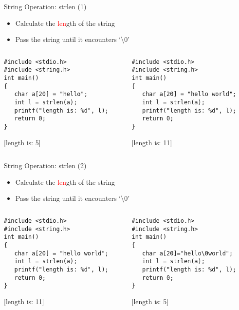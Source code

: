 \begin{frame}[fragile]{String Operation: strlen (1)}
\begin{itemize}
	\item {Calculate the \textcolor{red}{len}gth of the string}
	\item {Pass the string until it encounters `$\setminus$0'}
\end{itemize}
\begin{columns}
\begin{column}{0.5\linewidth}
\begin{lstlisting}
#include <stdio.h>
#include <string.h>
int main()
{
   char a[20] = "hello";
   int l = strlen(a);
   printf("length is: %d", l);
   return 0;
}
\end{lstlisting}
[length is: 5]
\end{column}
\begin{column}{0.5\linewidth}
\begin{lstlisting}
#include <stdio.h>
#include <string.h>
int main()
{
   char a[20] = "hello world";
   int l = strlen(a);
   printf("length is: %d", l);
   return 0;
}
\end{lstlisting}
[length is: 11]
\end{column}
\end{columns}
\end{frame}

\begin{frame}[fragile]{String Operation: strlen (2)}
\begin{itemize}
	\item {Calculate the \textcolor{red}{len}gth of the string}
	\item {Pass the string until it encounters `$\setminus$0'}
\end{itemize}
\begin{columns}
\begin{column}{0.5\linewidth}
\begin{lstlisting}
#include <stdio.h>
#include <string.h>
int main()
{
   char a[20] = "hello world";
   int l = strlen(a);
   printf("length is: %d", l);
   return 0;
}
\end{lstlisting}
[length is: 11]
\end{column}
\begin{column}{0.5\linewidth}
\begin{lstlisting}
#include <stdio.h>
#include <string.h>
int main()
{
   char a[20]="hello\0world";
   int l = strlen(a);
   printf("length is: %d", l);
   return 0;
}
\end{lstlisting}
[length is: 5]
\end{column}
\end{columns}
\end{frame}


